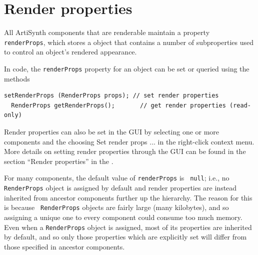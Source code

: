 %
%


\section{Render properties}
\label{RenderProperties:sec}

All ArtiSynth components that are renderable maintain a property {\tt
renderProps}, which stores a
 object that contains a number
of subproperties used to control an object's rendered appearance.

In code, the {\tt renderProps} property for an object can be set or
queried using the methods
%
\begin{lstlisting}[]
  setRenderProps (RenderProps props); // set render properties
  RenderProps getRenderProps();       // get render properties (read-only)
\end{lstlisting}
%
Render properties can also be set in the GUI by selecting one or more
components and the choosing {\sf Set render props ...}  in the
right-click context menu. More details on setting render properties
through the GUI can be found in the section ``Render properties'' in the
.

For many components, the default value of {\tt renderProps} is {\tt
null}; i.e., no {\tt RenderProps} object is assigned by default and
render properties are instead inherited from ancestor components
further up the hierarchy. The reason for this is because {\tt
RenderProps} objects are fairly large (many kilobytes), and so
assigning a unique one to every component could consume too much
memory. Even when a {\tt RenderProps} object is assigned, most of its
properties are inherited by default, and so only those properties
which are explicitly set will differ from those specified in ancestor
components.

